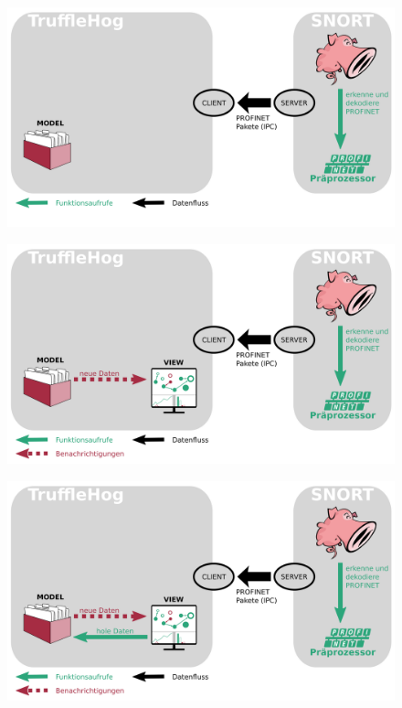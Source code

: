 \documentclass[18pt]{beamer}
\begin{document}
\begin{frame}
    \begin{figure}
    	\centering
    	\includegraphics[width=\textwidth]{./images/jan_7.png}
    \end{figure}
\end{frame}

\begin{frame}
    \begin{figure}
    	\centering
    	\includegraphics[width=\textwidth]{./images/jan_8.png}
    \end{figure}
\end{frame}

\begin{frame}
    \begin{figure}
    	\centering
    	\includegraphics[width=\textwidth]{./images/jan_9.png}
    \end{figure}
\end{frame}
\end{document}
